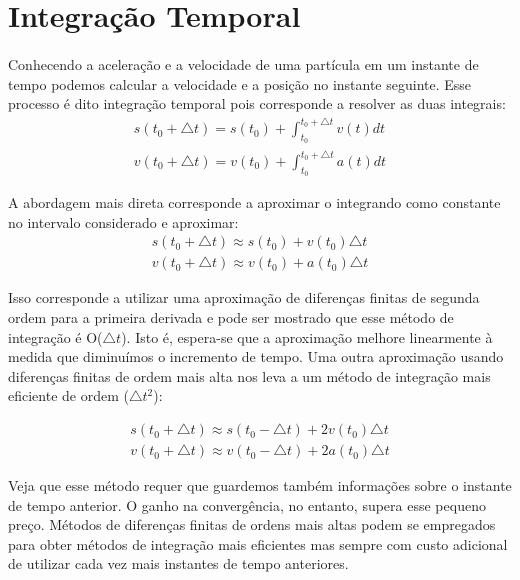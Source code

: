\documentclass[a4paper,11pt]{article}
\begin{document}
\section{Integração Temporal}

\paragraph{} Conhecendo a aceleração e a velocidade de uma partícula em um
instante de tempo podemos calcular a velocidade e a posição no instante
seguinte. Esse processo é dito integração temporal pois corresponde a 
resolver as duas integrais:
\begin{displaymath}
	\begin{array}{l}
		s(t_0+\triangle t) = s(t_0) + \int_{t_0}^{t_0+\triangle t} v(t) dt \\
		v(t_0+\triangle t) = v(t_0) + \int_{t_0}^{t_0+\triangle t} a(t) dt
	\end{array}
\end{displaymath}

A abordagem mais direta corresponde a aproximar o integrando como constante no
intervalo considerado e aproximar:
\begin{displaymath}
	\begin{array}{l}
		s(t_0+\triangle t) \approx s(t_0) + v(t_0)\triangle t  \\
		v(t_0+\triangle t) \approx v(t_0) + a(t_0)\triangle t
	\end{array}
\end{displaymath}

Isso corresponde a utilizar uma aproximação de diferenças finitas de
segunda ordem para a primeira derivada e pode ser mostrado que esse método
de integração é O($\triangle t$). Isto é, espera-se que a aproximação 
melhore linearmente à medida que diminuímos o incremento de tempo. Uma outra
aproximação usando diferenças finitas de ordem mais alta nos leva a um método
de integração mais eficiente de ordem ($\triangle t ^2$):

\begin{displaymath}
	\begin{array}{l}
		s(t_0+\triangle t) \approx s(t_0-\triangle t) + 2v(t_0)\triangle t  \\
		v(t_0+\triangle t) \approx v(t_0-\triangle t) + 2a(t_0)\triangle t
	\end{array}
\end{displaymath}

Veja que esse método requer que guardemos também  informações sobre o instante
de tempo anterior. O ganho na convergência, no entanto, supera esse pequeno
preço.
Métodos de diferenças finitas de ordens mais altas podem se empregados para obter
métodos de integração mais eficientes mas sempre com custo adicional de
utilizar cada vez mais instantes de tempo anteriores. 
 
\end{document}
